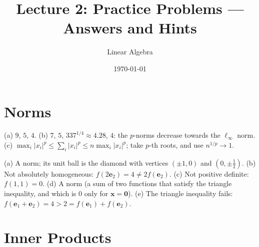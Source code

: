 \documentclass[11pt]{article}
\title{Lecture 2: Practice Problems --- Answers and Hints}
\author{Linear Algebra}
\date{\today}
\begin{document}
\maketitle

\section*{Norms}

\begin{description}[leftmargin=0pt, itemsep=0.3em]
    \item[\ref{pr:norms-compute}.] (a) $9$, $5$, $4$. (b) $7$, $5$, $337^{1/4} \approx 4.28$, $4$: the $p$-norms decrease towards the $\ell_\infty$ norm. (c) $\max_i |x_i|^p \leq \sum_i |x_i|^p \leq n \max_i |x_i|^p$; take $p$-th roots, and use $n^{1/p} \to 1$.
    \item[\ref{pr:which-norms}.] (a) A norm; its unit ball is the diamond with vertices $(\pm 1, 0)$ and $(0, \pm\frac{1}{2})$. (b) Not absolutely homogeneous: $f(2\mathbf{e}_2) = 4 \neq 2f(\mathbf{e}_2)$. (c) Not positive definite: $f(1, 1) = 0$. (d) A norm (a sum of two functions that satisfy the triangle inequality, and which is $0$ only for $\mathbf{x} = \mathbf{0}$). (e) The triangle inequality fails: $f(\mathbf{e}_1 + \mathbf{e}_2) = 4 > 2 = f(\mathbf{e}_1) + f(\mathbf{e}_2)$.
\end{description}

\section*{Inner Products}
\end{document}
